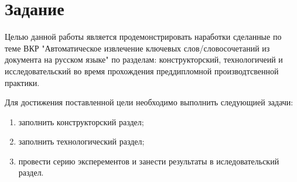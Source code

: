 \section{Задание}
Целью данной работы является продемонстрировать наработки сделанные по теме ВКР "Автоматическое извлечение ключевых слов/словосочетаний из документа на русском языке" по разделам: конструкторский, технологичеий и исследовательский во время прохождения преддипломной производтсвенной практики.

Для достижения поставленной цели необходимо выполнить следующией задачи:
\begin{enumerate}
	\item заполнить конструкторский раздел;
	\item заполнить технологический раздел;
	\item провести серию эксперементов и занести результаты в иследовательский раздел.

\end{enumerate}